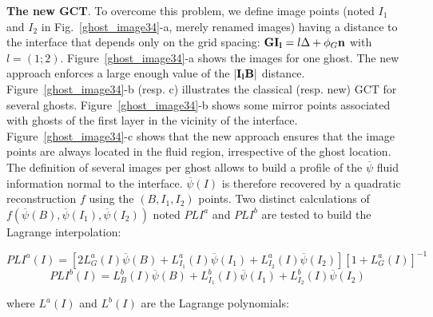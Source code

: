 {\bf The new GCT}. To overcome this problem, we define image points (noted $I_1$ and $I_2$ in Fig.~\ref{ghost_image34}-a, merely renamed images) having a distance to the interface that depends only on the grid spacing: ${\bf GI_l}=l\Delta + \phi_G {\bf n}$ with $l=(1;2)$. Figure~\ref{ghost_image34}-a shows the images for one ghost. The new approach enforces a large enough value of the $| {\bf I_lB} |$ distance. Figure~\ref{ghost_image34}-b (resp. c) illustrates the classical (resp. new) GCT for several ghosts. Figure~\ref{ghost_image34}-b shows some mirror points associated with ghosts of the first layer in the vicinity of the interface. Figure~\ref{ghost_image34}-c shows that the new approach ensures that the image points are always located in the fluid region, irrespective of the ghost location. The definition of several images per ghost allows to build a profile of the $\overline{\psi}$ fluid information normal to the interface. $\overline{\psi}(I)$ is therefore recovered by a quadratic reconstruction $f$ using the $(B,I_1,I_2)$ points. Two distinct calculations of $f(\overline{\psi}(B),\overline{\psi}(I_1),\overline{\psi}(I_2))$ noted $PLI^{a}$ and $PLI^{b}$ are tested to build the Lagrange interpolation:

\vspace{-0.25cm}
\begin{equation}
	PLI^{a}(I)=[2L^{a}_{G}(I)\overline{\psi}(B)+L^{a}_{I_1}(I)\overline{\psi}(I_1)+L^{a}_{I_2}(I)\overline{\psi}(I_2)][1+L^{a}_{G}(I)]^{-1}
\end{equation} 
\vspace{-0.25cm}	
\vspace{-0.25cm}
\begin{equation}	
	PLI^{b}(I)=L^{b}_{B}(I)\overline{\psi}(B)+L^{b}_{I_1}(I)\overline{\psi}(I_1)+L^{b}_{I_2}(I)\overline{\psi}(I_2)
\end{equation}
\vspace{-0.25cm}

where $L^{a}(I)$ and $L^{b}(I)$ are the Lagrange polynomials:

